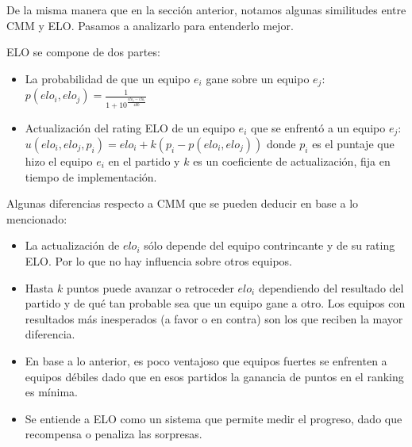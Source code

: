 De la misma manera que en la sección anterior, notamos algunas similitudes entre CMM y ELO. Pasamos a analizarlo para entenderlo mejor.

ELO se compone de dos partes:

\begin{itemize}
    \item La probabilidad de que un equipo $e_i$ gane sobre un equipo $e_j$: $p(elo_i, elo_j) = \frac{1}{1 + 10^{\frac{elo_j - elo_i}{400}}}$
    \item Actualización del rating ELO de un equipo $e_i$ que se enfrentó a un equipo $e_j$: $u(elo_i, elo_j, p_i) = elo_i + k(p_i - p(elo_i, elo_j))$ donde $p_i$ es el puntaje que hizo el equipo $e_i$ en el partido y $k$ es un coeficiente de actualización, fija en tiempo de implementación.
\end{itemize}

Algunas diferencias respecto a CMM que se pueden deducir en base a lo mencionado:

\begin{itemize}
    \item La actualización de $elo_i$ sólo depende del equipo contrincante y de su rating ELO. Por lo que no hay influencia sobre otros equipos.
    \item Hasta $k$ puntos puede avanzar o retroceder $elo_i$ dependiendo del resultado del partido y de qué tan probable sea que un equipo gane a otro. Los equipos con resultados más inesperados (a favor o en contra) son los que reciben la mayor diferencia.
    \item En base a lo anterior, es poco ventajoso que equipos fuertes se enfrenten a equipos débiles dado que en esos partidos la ganancia de puntos en el ranking es mínima.
    \item Se entiende a ELO como un sistema que permite medir el progreso, dado que recompensa o penaliza las sorpresas.
\end{itemize}

